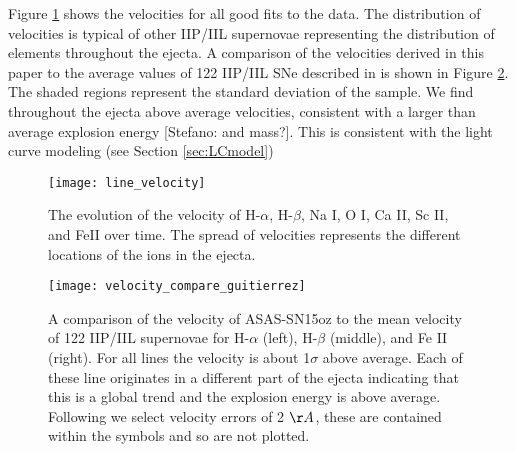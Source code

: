 \documentclass[preprint]{aastex61}
\newcommand{\stefanocomment}[1]{{\color{cyan} [{#1}]}}
\newcommand{\Stefano}[1]{\stefanocomment{Stefano: #1}}
\begin{document}
Figure \ref{fig:velocity} shows the velocities for all good fits to the data. 
The distribution of velocities is typical of other IIP/IIL supernovae representing the distribution of elements throughout the ejecta. 
A comparison of the velocities derived in this paper to the average values of 122 IIP/IIL SNe described in \citet{2017gutierrez} is shown in Figure \ref{fig:VelocityCompare}. The shaded regions represent the standard deviation of the sample.
We find throughout the ejecta above average velocities, consistent with a larger than average explosion energy \Stefano{and mass?}. 
This is consistent with the light curve modeling (see Section \ref{sec:LCmodel})

\begin{figure}[htbp]
\begin{center}
\texttt{[image: line\_velocity]}
\caption{The evolution of the velocity of H-$\alpha$, H-$\beta$, Na I, O I, Ca II, Sc II, and FeII over time. 
The spread of velocities represents the different locations of the ions in the ejecta.}
\label{fig:velocity}
\end{center}
\end{figure}

\begin{figure}[htbp]
\begin{center}
\texttt{[image: velocity\_compare\_guitierrez]}
\caption{A comparison of the velocity of ASAS-SN15oz to the mean velocity of 122 IIP/IIL supernovae \citep{2017gutierrez} for H-$\alpha$ (left), H-$\beta$ (middle), and Fe II (right).
For all lines the velocity is about 1$\sigma$ above average. 
Each of these line originates in a different part of the ejecta indicating that this is a global trend and the explosion energy is above average. 
Following \citep{2012silverman} we select velocity errors of 2 $\AA$, these are contained within the symbols and so are not plotted.}
\label{fig:VelocityCompare}
\end{center}
\end{figure}
\end{document}
